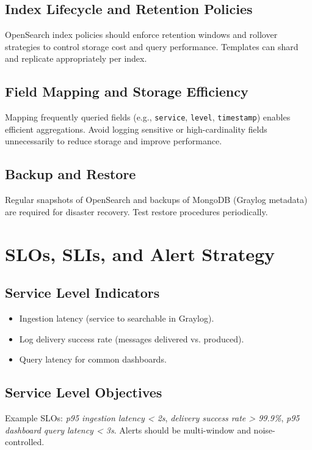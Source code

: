 \documentclass[12pt,a4paper]{report}
\begin{document}
\section{Index Lifecycle and Retention Policies}
OpenSearch index policies should enforce retention windows and rollover strategies to control storage cost and query performance. Templates can shard and replicate appropriately per index.

\section{Field Mapping and Storage Efficiency}
Mapping frequently queried fields (e.g., \texttt{service}, \texttt{level}, \texttt{timestamp}) enables efficient aggregations. Avoid logging sensitive or high-cardinality fields unnecessarily to reduce storage and improve performance.

\section{Backup and Restore}
Regular snapshots of OpenSearch and backups of MongoDB (Graylog metadata) are required for disaster recovery. Test restore procedures periodically.

\chapter{SLOs, SLIs, and Alert Strategy}
\section{Service Level Indicators}
\begin{itemize}[leftmargin=1.2cm]
  \item Ingestion latency (service to searchable in Graylog).
  \item Log delivery success rate (messages delivered vs. produced).
  \item Query latency for common dashboards.
\end{itemize}

\section{Service Level Objectives}
Example SLOs: \textit{p95 ingestion latency < 2s}, \textit{delivery success rate > 99.9\%}, \textit{p95 dashboard query latency < 3s}. Alerts should be multi-window and noise-controlled.
\end{document}
